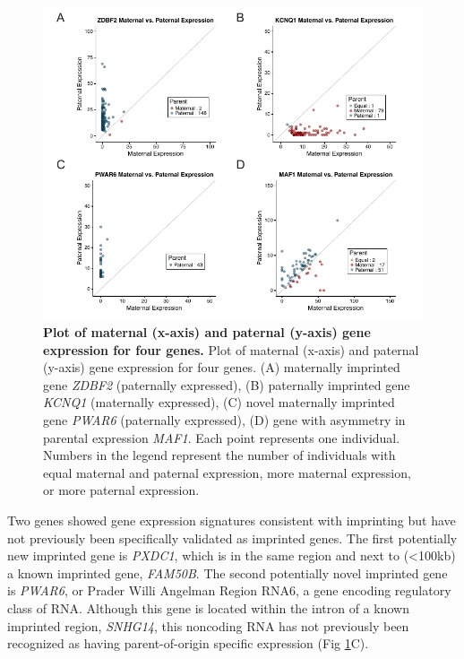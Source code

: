 \begin{figure}[!htb]
\centering \includegraphics[width=7in]{img/ch03/fig-01.pdf}
\caption[Plot of maternal (x-axis) and paternal (y-axis) gene expression for four genes.]{\textbf{Plot of maternal (x-axis) and paternal (y-axis) gene expression for four genes.} Plot of maternal (x-axis) and paternal (y-axis) gene expression for four genes. (A) maternally imprinted gene \emph{ZDBF2} (paternally expressed), (B) paternally imprinted gene \emph{KCNQ1} (maternally expressed), (C) novel maternally imprinted gene \emph{PWAR6} (paternally expressed), (D) gene with asymmetry in parental expression \emph{MAF1}. Each point represents one individual. Numbers in the legend represent the number of individuals with equal maternal and paternal expression, more maternal expression, or more paternal expression.}
\label{fig:matpatexpression}
\end{figure}


Two genes showed gene expression signatures consistent with imprinting but have not previously been specifically validated as imprinted genes. The first potentially new imprinted gene is \emph{PXDC1}, which is in the same region and next to (\textless100kb) a known imprinted gene, \emph{FAM50B}. The second potentially novel imprinted gene is \emph{PWAR6}, or Prader Willi Angelman Region RNA6, a gene encoding regulatory class of RNA. Although this gene is located within the intron of a known imprinted region, \emph{SNHG14}, this noncoding RNA has not previously been recognized as having parent-of-origin specific expression (Fig \ref{fig:matpatexpression}C).

